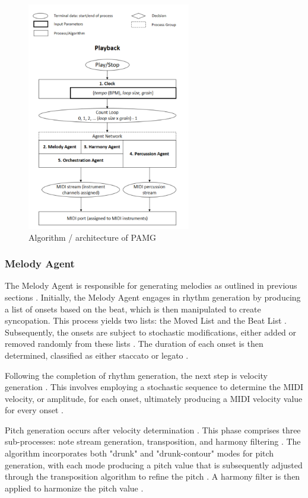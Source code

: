 \begin{figure}[h]
    \centering
    \includegraphics[width=\linewidth,height=10cm]{images/pamg_algorithm.png}
    \caption{Algorithm / architecture of PAMG \cite{lopez2023progressive}}
    \label{fig:pamg_algorithm}
\end{figure}


\subsubsection{Melody Agent}

The Melody Agent is responsible for generating melodies as outlined in previous sections \cite{lopez2023progressive}. Initially, the Melody Agent engages in rhythm generation by producing a list of onsets based on the beat, which is then manipulated to create syncopation. This process yields two lists: the Moved List and the Beat List \cite{lopez2023progressive}. Subsequently, the onsets are subject to stochastic modifications, either added or removed randomly from these lists \cite{lopez2023progressive}. The duration of each onset is then determined, classified as either staccato or legato \cite{lopez2023progressive}.

Following the completion of rhythm generation, the next step is velocity generation \cite{lopez2023progressive}. This involves employing a stochastic sequence to determine the MIDI velocity, or amplitude, for each onset, ultimately producing a MIDI velocity value for every onset \cite{lopez2023progressive}.

Pitch generation occurs after velocity determination \cite{lopez2023progressive}. This phase comprises three sub-processes: note stream generation, transposition, and harmony filtering \cite{lopez2023progressive}. The algorithm incorporates both "drunk" and "drunk-contour" modes for pitch generation, with each mode producing a pitch value that is subsequently adjusted through the transposition algorithm to refine the pitch \cite{lopez2023progressive}. A harmony filter is then applied to harmonize the pitch value \cite{lopez2023progressive}.

